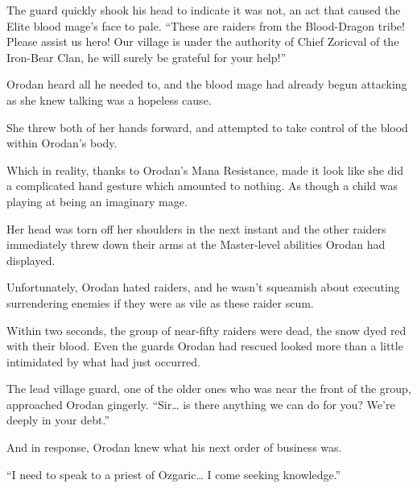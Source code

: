 \documentclass[a4paper,10pt]{book}
\begin{document}
The guard quickly shook his head to indicate it was not, an act that caused the Elite blood mage’s face to pale. “These are raiders from the Blood-Dragon tribe! Please assist us hero! Our village is under the authority of Chief Zoricval of the Iron-Bear Clan, he will surely be grateful for your help!”\par
Orodan heard all he needed to, and the blood mage had already begun attacking as she knew talking was a hopeless cause.\par
She threw both of her hands forward, and attempted to take control of the blood within Orodan’s body.\par
Which in reality, thanks to Orodan’s Mana Resistance, made it look like she did a complicated hand gesture which amounted to nothing. As though a child was playing at being an imaginary mage.\par
Her head was torn off her shoulders in the next instant and the other raiders immediately threw down their arms at the Master-level abilities Orodan had displayed.\par
Unfortunately, Orodan hated raiders, and he wasn’t squeamish about executing surrendering enemies if they were as vile as these raider scum.\par
Within two seconds, the group of near-fifty raiders were dead, the snow dyed red with their blood. Even the guards Orodan had rescued looked more than a little intimidated by what had just occurred.\par
The lead village guard, one of the older ones who was near the front of the group, approached Orodan gingerly. “Sir… is there anything we can do for you? We’re deeply in your debt.”\par
And in response, Orodan knew what his next order of business was.\par
“I need to speak to a priest of Ozgaric… I come seeking knowledge.”\par
\end{document}

